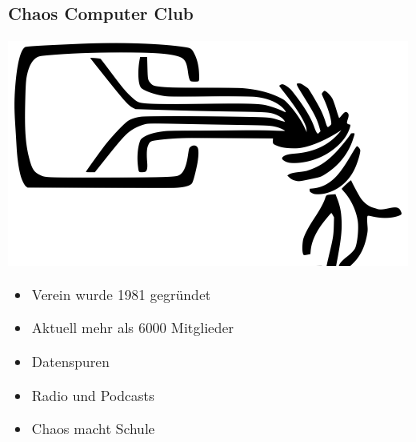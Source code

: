 \documentclass[12pt]{beamer}
\begin{document}
\begin{frame}
\begin{figure}
  \end{figure}
\end{frame}

\begin{frame}
	\frametitle{Chaos Computer Club}
	\begin{center}
		\includegraphics[height=0.2\textheight]{img/chaosknoten.png}
	\end{center}	
	\begin{itemize}
		\item Verein wurde 1981 gegründet
		\item Aktuell mehr als 6000 Mitglieder
		\item Datenspuren
		\item Radio und Podcasts
		\item Chaos macht Schule
	\end{itemize}
\end{frame}
\end{document}
